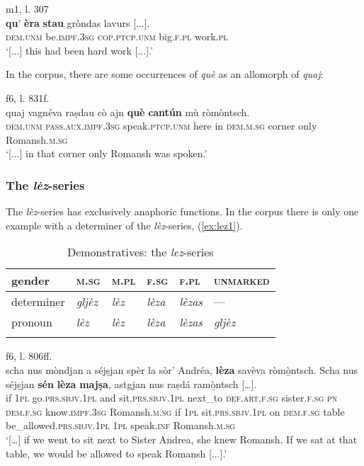 \ea

 {m1, l. 307}\\
\gll    [...] \textbf{qu}’ \textbf{èra} \textbf{stau} gròndas lavurs [...].\\
{} \textsc{dem.unm} be.\textsc{impf.3sg} \textsc{cop.ptcp.unm} big.\textsc{f.pl} work.\textsc{pl}\\
\glt `[...] this had been  hard work [...].'
\z

In the corpus, there are some occurrences of \textit{què} as an allomorph of \textit{quaj}:

\ea

 {f6, l. 831f.}\\
\gll    [...] quaj vagnéva raṣdau cò ajn \textbf{què} \textbf{cantún} mù ròmòntsch.\\
{} \textsc{dem.unm} \textsc{pass.aux.impf.3sg} speak.\textsc{ptcp.unm} here in  \textsc{dem.m.sg} corner only Romansh.\textsc{m.sg}\\
\glt `[...] in that corner only Romansh was spoken.'
\z

\subsubsection{The \textit{lèz}-series}

The \textit{lèz}-series has exclusively anaphoric functions. In the corpus there is only one example with a determiner of the \textit{lèz}-series, (\ref{ex:lez1}).

\begin{table}
\caption{Demonstratives: the \textit{lez}-series}
\label{demlez}
 \begin{tabular}{llllll}
  \lsptoprule
         gender   & \textsc{m.sg} & \textsc{m.pl} & \textsc{f.sg} & \textsc{f.pl} & \textsc{unmarked}\\
  \midrule
  determiner  & \textit{gljèz} &  \textit{lèz}  & \textit{lèza}  & \textit{lèzas} & ---\\
  pronoun  & \textit{lèz} & \textit{lèz} & \textit{lèza} & \textit{lèzas} & \textit{gljèz} \\
  \lspbottomrule
 \end{tabular}
\end{table}

\ea
\label{ex:lez1}
 {f6, l. 806ff.}\\
\gll […] scha nus mòndjan a séjṣjan spèr la sòr’ Andréa, \textbf{lèza} savèva ròmò̱ntsch. Scha nus séjṣjan \textbf{sén} \textbf{lèza} \textbf{majṣa}, astgjan nus raṣdá ramò̱ntsch […].\\
{} if \textsc{1pl} go.\textsc{prs.sbjv.1pl} and sit.\textsc{prs.sbjv.1pl} next\_to \textsc{def.art.f.sg} sister.\textsc{f.sg} \textsc{pn} \textsc{dem.f.sg} know.\textsc{impf.3sg} Romansh.\textsc{m.sg} if \textsc{1pl} sit.\textsc{prs.sbjv.1pl} on \textsc{dem.f.sg} table be\_allowed.\textsc{prs.sbjv.1pl} \textsc{1pl} speak.\textsc{inf} Romansh.\textsc{m.sg}\\
\glt `[…] if we went to sit next to Sister Andrea, she knew Romansh. If we sat at that table, we would be allowed to speak Romansh [...].'
\z

